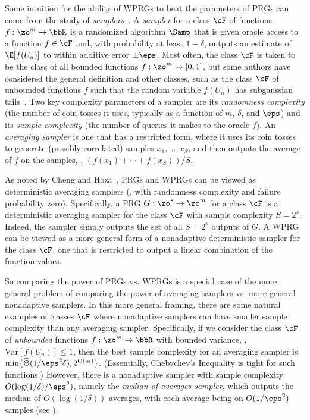 \documentclass{toc}
\begin{document}
Some intuition for the ability of WPRGs to beat the parameters of PRGs can come from
the study of \emph{samplers}~\cite{Goldreich97}.  A \emph{sampler} for a class $\cF$ of
functions $f : \zo^m\rightarrow \bbR$ is %
a 
%
randomized algorithm $\Samp$ that is given 
oracle access to a function $f\in \cF$ and, with probability at least $1-\delta$, outputs an estimate of $\E[f(U_n)]$ to within additive error $\pm \eps$. Most often, the class $\cF$ is taken to be the class of all bounded functions $f : \zo^m \rightarrow [0,1]$, but some
%
authors  %
have considered the general definition and other classes, such as the class $\cF$ of unbounded functions $f$ such that the random variable $f(U_n)$ has subgaussian tails~\cite{Blasiok18,Agrawal19}.  Two key complexity parameters of a sampler are its \emph{randomness complexity} (the number of coin tosses it uses, typically as a function of $m$, $\delta$, and $\eps$)  and its 
\emph{sample complexity} (the number of queries it makes to the oracle $f$).
An \emph{averaging sampler} is one that has a restricted form, where it uses its coin tosses to generate (possibly correlated) samples $x_1,\ldots,x_S$, and then outputs the average of $f$
on the samples, \ie, $(f(x_1)+\cdots+f(x_S))/S$.

As noted by Cheng and Hoza~\cite{ChengHo20}, PRGs and WPRGs can be viewed as deterministic averaging samplers (\ie, with randomness complexity and failure probability zero).  Specifically,
a PRG $G : \zo^s\rightarrow \zo^m$ for a class $\cF$ is a deterministic averaging sampler for the class $\cF$ with sample complexity $S=2^s$.  Indeed, the sampler simply outputs the set of all $S=2^s$ outputs of $G$. A WPRG can be viewed as a more general form of a nonadaptive deterministic sampler for the class $\cF$, one that is restricted to output a linear combination of the function values.

So comparing the power of PRGs vs. WPRGs is a special case of the more general problem of comparing the power of averaging samplers vs. more general nonadaptive samplers.  In this more general framing, there are some natural examples of classes $\cF$ where nonadaptive samplers can have smaller sample complexity than any averaging sampler.  Specifically, if we consider the class $\cF$ of \emph{unbounded} functions $f : \zo^m\rightarrow \bbR$ with bounded variance, \ie, $\mathrm{Var}[f(U_n)]\leq 1$, then the best sample complexity for an averaging sampler is
$\min\{\widetilde{\Theta}(1/\eps^2\delta),2^{\Theta(m)}\}$. (Essentially, Chebychev's Inequality is tight for such functions.)  However, there is a nonadaptive sampler with sample complexity $O(\log(1/\delta)/\eps^2)$, namely the \emph{median-of-averages sampler}, which outputs the median of $O(\log(1/\delta))$ averages, with each average being on $O(1/\eps^2)$ samples (see ).
\end{document}
